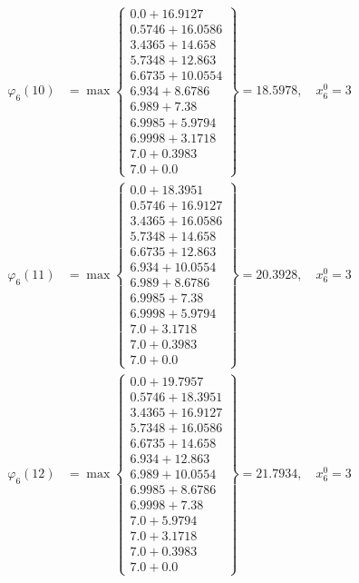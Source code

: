 \documentclass{article}
\begin{document}
\begin{align*}
\varphi_{6}(10) &= \max \left\{ \begin{array}{c}
0.0 + 16.9127 \\
 0.5746 + 16.0586 \\
 3.4365 + 14.658 \\
 5.7348 + 12.863 \\
 6.6735 + 10.0554 \\
 6.934 + 8.6786 \\
 6.989 + 7.38 \\
 6.9985 + 5.9794 \\
 6.9998 + 3.1718 \\
 7.0 + 0.3983 \\
 7.0 + 0.0
\end{array} \right\}=18.5978, \quad x_{6}^0=3\\
  
\varphi_{6}(11) &= \max \left\{ \begin{array}{c}
0.0 + 18.3951 \\
 0.5746 + 16.9127 \\
 3.4365 + 16.0586 \\
 5.7348 + 14.658 \\
 6.6735 + 12.863 \\
 6.934 + 10.0554 \\
 6.989 + 8.6786 \\
 6.9985 + 7.38 \\
 6.9998 + 5.9794 \\
 7.0 + 3.1718 \\
 7.0 + 0.3983 \\
 7.0 + 0.0
\end{array} \right\}=20.3928, \quad x_{6}^0=3\\
  
\varphi_{6}(12) &= \max \left\{ \begin{array}{c}
0.0 + 19.7957 \\
 0.5746 + 18.3951 \\
 3.4365 + 16.9127 \\
 5.7348 + 16.0586 \\
 6.6735 + 14.658 \\
 6.934 + 12.863 \\
 6.989 + 10.0554 \\
 6.9985 + 8.6786 \\
 6.9998 + 7.38 \\
 7.0 + 5.9794 \\
 7.0 + 3.1718 \\
 7.0 + 0.3983 \\
 7.0 + 0.0
\end{array} \right\}=21.7934, \quad x_{6}^0=3\\
  

\end{align*}
\end{document}
